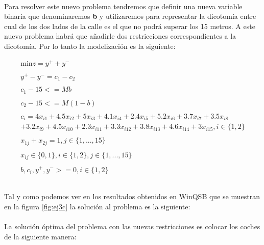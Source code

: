 \documentclass[10pt, a4paper]{article}
\begin{document}
			\paragraph{}
			Para resolver este nuevo problema tendremos que definir una nueva variable binaria que denominaremos \textbf{b} y utilizaremos para representar la dicotomía entre cual de los dos lados de la calle es el que no podrá superar los 15 metros. A este nuevo problema habrá que añadirle dos restricciones correspondientes a la dicotomía. Por lo tanto la modelización es la siguiente:

			\[
				\begin{split}
					\text{min} z = y^{+} + y^{-} \\ \\
						y^{+} - y^{-} = c_1 - c_2 \\ \\
						c_1 - 15 <= Mb \\ \\
						c_2 - 15 <= M(1-b) \\ \\
						c_i = 4x_{i1} + 4.5x_{i2} + 5x_{i3} + 4.1x_{i4} + 2.4x_{i5} + 5.2x_{i6} + 3.7x_{i7} + 3.5x_{i8} \\
						+ 3.2x_{i9} + 4.5x_{i10} + 2.3x_{i11} + 3.3x_{i12} + 3.8x_{i13} + 4.6x_{i14} + 3x_{i15}, i \in \{1,2\}\\ \\
						x_{1j} + x_{2j} = 1, j \in \{1,...,15\} \\ \\
						x_{ij} \in \{0,1\}, i \in \{1,2\},j \in \{1,...,15\} \\ \\
						b, c_{i}, y^{+}, y^{-} >= 0, i \in \{1,2\}\\ \\
				\end{split}
			\]

			\paragraph{}
			Tal y como podemos ver en los resultados obtenidos en WinQSB que se muestran en la figura \ref{fig:ej3c} la solución al problema es la siguiente:
			\paragraph{}
			La solución óptima del problema con las nuevas restricciones es colocar los coches de la siguiente manera:
\end{document}
